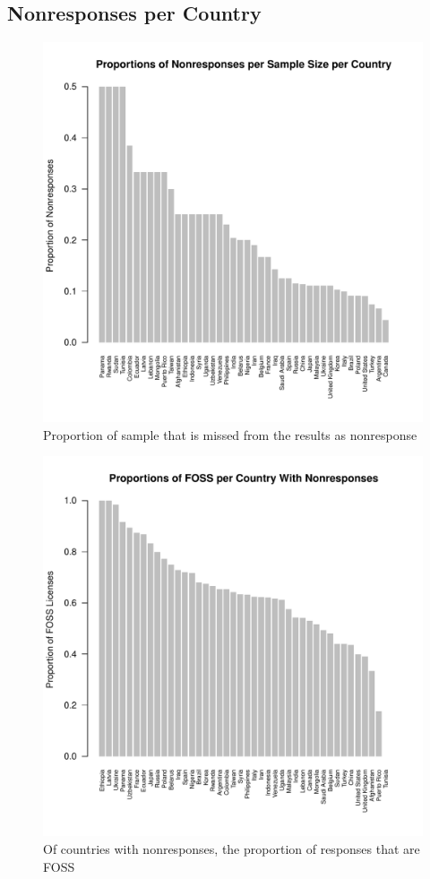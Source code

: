 \documentclass{article}
\theoremstyle{definition}
\begin{document}
\subsection{Nonresponses per Country} \label{sec:plots}
\begin{figure}[H]
\centering
\includegraphics{graphics/missingprops.pdf}
\caption{Proportion of sample that is missed from the results as nonresponse}
\label{fig:props}
\end{figure}

\begin{figure}[H]
\centering
\includegraphics{graphics/country_props.pdf}
\caption{Of countries with nonresponses, the proportion of responses that are FOSS}
\label{fig:country}
\end{figure}
\end{document}
